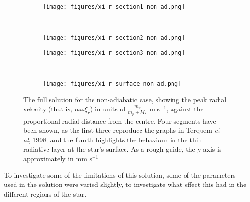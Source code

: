 \documentclass[11pt]{amsart}
\begin{document}
\begin{figure}[htbp]
\begin{center}
\begin{subfigure}{0.5\textwidth}
\texttt{[image: figures/xi\_r\_section1\_non-ad.png]}
\end{subfigure}
~
\begin{subfigure}{0.5\textwidth}
\texttt{[image: figures/xi\_r\_section2\_non-ad.png]}
\end{subfigure}

\begin{subfigure}{0.5\textwidth}
\texttt{[image: figures/xi\_r\_section3\_non-ad.png]}
\end{subfigure}
~
\begin{subfigure}{0.5\textwidth}
\texttt{[image: figures/xi\_r\_surface\_non-ad.png]}
\end{subfigure}

\caption{The full solution for the non-adiabatic case, showing the peak radial velocity (that is, $m \omega \xi_{r}$) in units of $\frac{m_{p}}{m_{p} + M_{*}}$ m s$^{-1}$, against the proportional radial distance from the centre.  Four segments have been shown, as the first three reproduce the graphs in Terquem \textit{et al}, 1998, and the fourth highlights the behaviour in the thin radiative layer at the star's surface.  As a rough guide, the y-axis is approximately in mm s$^{-1}$}
\label{fig:non-ad}
\end{center}
\end{figure}



To investigate some of the limitations of this solution, some of the parameters used in the solution were varied slightly, to investigate what effect this had in the different regions of the star.
\end{document}
